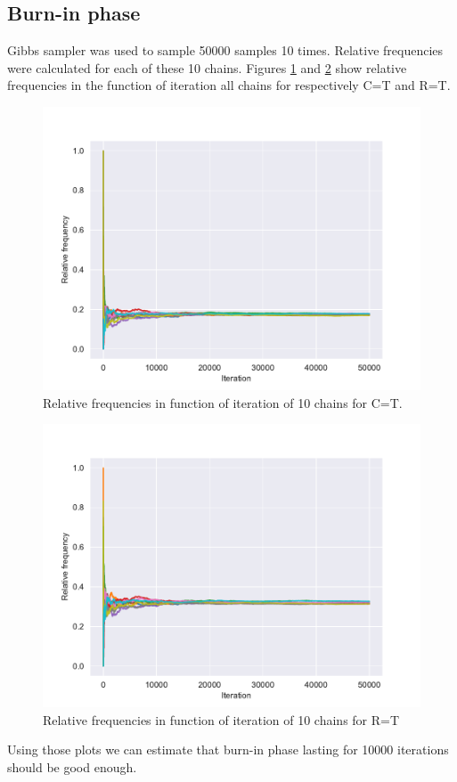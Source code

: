 \documentclass[a4paper,11pt]{article}
\begin{document}
\subsection{Burn-in phase}
Gibbs sampler was used to sample 50000 samples 10 times. Relative frequencies were calculated for each of these 10 chains. Figures \ref{fig2} and \ref{fig3} show relative frequencies in the function of iteration all chains for respectively C=T and R=T.
\begin{figure}[H]
    \centering
    \includegraphics[scale = 0.86]{Plots/freqplot_cloudy.pdf}
    \caption{Relative frequencies in function of iteration of 10 chains for C=T.}
    \label{fig2}
\end{figure}
\begin{figure}[H]
    \centering
    \includegraphics[scale = 0.86]{Plots/freqplot_rainy.pdf}
    \caption{Relative frequencies in function of iteration of 10 chains for R=T}
    \label{fig3}
\end{figure}
\noindent Using those plots we can estimate that burn-in phase lasting for 10000 iterations should be good enough.
\end{document}
